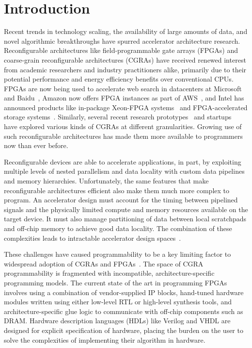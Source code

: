 \section{Introduction}
\label{intro}

Recent trends in technology scaling, the availability of large amounts of data, and novel algorithmic breakthroughs
have spurred accelerator architecture research. Reconfigurable architectures like field-programmable gate arrays (FPGAs) and coarse-grain reconfigurable  architectures (CGRAs)
have received renewed interest from academic researchers and industry practitioners alike, primarily due to their potential performance and energy efficiency benefits over conventional CPUs. 
FPGAs are now being used to accelerate web search
in datacenters at Microsoft and Baidu~\cite{catapult, baidu},
Amazon now offers FPGA instances as part of AWS~\cite{awsf1}, 
and Intel has announced products like in-package Xeon-FPGA systems~\cite{harp}
and FPGA-accelerated storage systems~\cite{nand_flash}.
Similarly, several recent research prototypes~\cite{dyser, ti, scaledeep, scnn, plasticine}
and startups~\cite{wavecomp, nervana} have explored various
kinds of CGRAs at different granularities. 
Growing use of such reconfigurable architectures has made them more available to programmers now than ever before.


Reconfigurable devices are able to accelerate applications, in part, by exploiting multiple levels of nested parallelism and data locality with custom data pipelines and memory hierarchies.
Unfortunately, the same features that make reconfigurable architectures efficient also make them much more complex to program. An accelerator design must account for the timing between pipelined signals and
the physically limited compute and memory resources available on the target device. It must also manage partitioning of data between local scratchpads and off-chip memory to achieve good data locality. 
The combination of these complexities leads to intractable accelerator design spaces~\cite{cascaval}.


These challenges have caused programmability to be a key limiting factor to widespread adoption of CGRAs and FPGAs~\cite{fpgaMasses,DeSutter2013}. 
The space of CGRA programmability is fragmented with incompatible, architecture-specific programming models.
The current state of the art in programming FPGAs involves using a combination of vendor-supplied IP blocks, hand-tuned hardware modules written using either low-level RTL or high-level synthesis tools, and architecture-specific glue logic to communicate with off-chip components such as DRAM. 
Hardware description languages (HDLs) like Verilog and VHDL are designed for explicit specification of hardware, 
placing the burden on the user to solve the complexities of implementing their algorithm in hardware.


